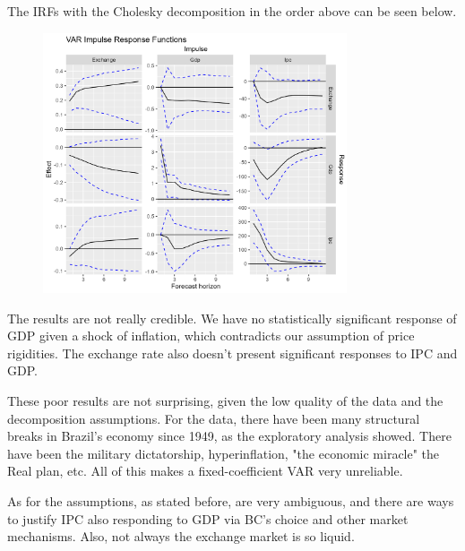 \documentclass[12pt]{article}
\begin{document}
The IRFs with the Cholesky decomposition in the order above can be seen below.

\begin{figure}[H]
    \centering
    \includegraphics[width=0.8\textwidth]{figures/irfs.png}
\end{figure}

The results are not really credible. We have no statistically significant response of GDP given a shock of inflation, which contradicts our assumption of price rigidities. The exchange rate also doesn't present significant responses to IPC and GDP.

These poor results are not surprising, given the low quality of the data and the decomposition assumptions. For the data, there have been many structural breaks in Brazil's economy since 1949, as the exploratory analysis showed. There have been the military dictatorship, hyperinflation, "the economic miracle" the Real plan, etc. All of this makes a fixed-coefficient VAR very unreliable.

As for the assumptions, as stated before, are very ambiguous, and there are ways to justify IPC also responding to GDP via BC's choice and other market mechanisms. Also, not always the exchange market is so liquid.
\end{document}
